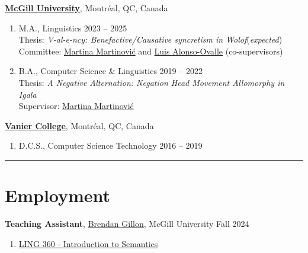\documentclass[margin,line]{resume}
\begin{document}
\begin{resume}
	\href{https://www.mcgill.ca/}{\textbf{McGill University}}, Montréal, QC, Canada
	\begin{enumerate}[-, leftmargin=1em, topsep=4pt]
		\item[] M.A., %
		      Linguistics%
		      \hfill 2023 -- 2025 \\
			  {\small Thesis: {\it V-al-e-ncy: Benefactive/Causative syncretism in Wolof}\hfill (\textit{expected})\\
			  Committee: \href{https://inamartinovic.com/}{Martina Martinović} and \href{https://people.linguistics.mcgill.ca/~luis.alonso-ovalle/}{Luis Alonso-Ovalle} (co-supervisors)}\vspace{0.2em}
		\item[] B.A., %
		      Computer Science %
		      \& %
		      Linguistics%
		      \hfill 2019 -- 2022\\
			  {\small Thesis: {\it A Negative Alternation: Negation Head Movement Allomorphy in Igala}\\
			  Supervisor: \href{https://inamartinovic.com/}{Martina Martinović}}
	\end{enumerate}

	\href{https://www.vaniercollege.qc.ca/}{\textbf{Vanier College}}, Montréal, QC, Canada
	\begin{enumerate}[-, leftmargin=1em, topsep=4pt]
		\item[]  D.C.S., Computer Science Technology \hfill 2016 -- 2019
	\end{enumerate}

	\vspace{-1.2em}\rule{\textwidth}{0.4pt}





	\section{\mysidestyle Employment}

	\textbf{Teaching Assistant}, \href{https://sites.google.com/view/brendangillon}{Brendan Gillon}, McGill University \hfill Fall 2024
	\begin{enumerate}[-, leftmargin=1em, topsep=4pt]
		\item[] \href{https://www.mcgill.ca/study/2024-2025/courses/ling-360}{LING 360 - Introduction to Semantics}
	\end{enumerate}


\end{resume}
\end{document}
